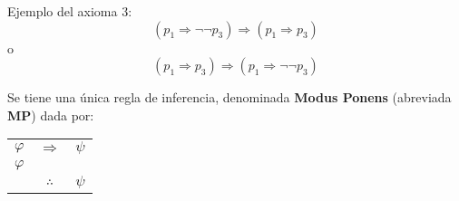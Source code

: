 \documentclass[12pt]{report}
\renewcommand{\theenumii}{\roman{enumii}}
\theoremstyle{largebreak}
\begin{document}
    \begin{exa}
        Ejemplo del axioma 3:
        \begin{equation*}
            (p_1\Rightarrow\neg\neg p_3)\Rightarrow(p_1\Rightarrow p_3)
        \end{equation*}
        o
        \begin{equation*}
            (p_1\Rightarrow p_3)\Rightarrow(p_1\Rightarrow\neg\neg p_3)
        \end{equation*}
    \end{exa}

    \begin{mydef}
        Se tiene una única regla de inferencia, denominada \textbf{Modus Ponens} (abreviada \textbf{MP}) dada por:
        \begin{center}
            \begin{tabular}{c c c}
                $\varphi$ & $\Rightarrow$ & $\psi$ \\
                $\varphi$ &  &  \\
                \hline
                 & $\therefore$ & $\psi$ \\
            \end{tabular}
        \end{center}
    \end{mydef}

    \renewcommand{\theenumi}{\arabic{enumi}}

    \renewcommand{\theenumii}{\arabic{enumi}.\roman{enumii}}

    \renewcommand{\theenumiii}{\roman{enumi}.\roman{enumii}.\alph{enumiii}}
\end{document}
